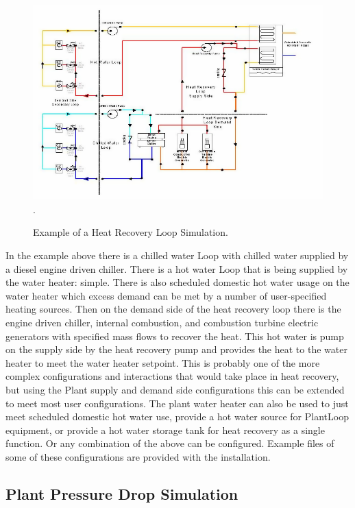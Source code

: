 \begin{figure}[hbtp] %
\centering
\includegraphics{media/image1977.png}.
\caption{Example of a Heat Recovery Loop Simulation. \protect \label{fig:example-heat-recovery-loop-simulation}}
\end{figure}

In the example above there is a chilled water Loop with chilled water supplied by a diesel engine driven chiller. There is a hot water Loop that is being supplied by the water heater: simple. There is also scheduled domestic hot water usage on the water heater which excess demand can be met by a number of user-specified heating sources. Then on the demand side of the heat recovery loop there is the engine driven chiller, internal combustion, and combustion turbine electric generators with specified mass flows to recover the heat. This hot water is pump on the supply side by the heat recovery pump and provides the heat to the water heater to meet the water heater setpoint. This is probably one of the more complex configurations and interactions that would take place in heat recovery, but using the Plant supply and demand side configurations this can be extended to meet most user configurations. The plant water heater can also be used to just meet scheduled domestic hot water use, provide a hot water source for PlantLoop equipment, or provide a hot water storage tank for heat recovery as a single function. Or any combination of the above can be configured. Example files of some of these configurations are provided with the installation.

\subsection{Plant Pressure Drop Simulation}\label{plant-pressure-drop-simulation}

